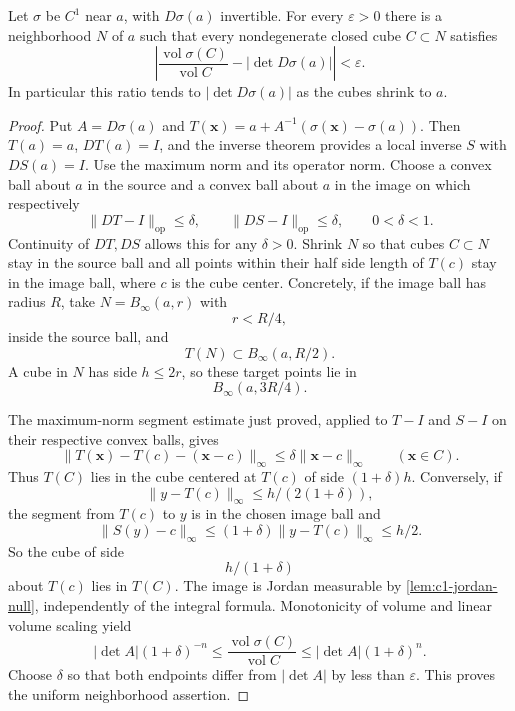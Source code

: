 \begin{proposition}\label{lem:local-volume-comparison}
Let $\sigma$ be $C^1$ near $a$, with $D\sigma(a)$ invertible. For every
$\varepsilon>0$ there is a neighborhood $N$ of $a$ such that every
nondegenerate closed cube $C\subset N$ satisfies
\[
\left|\frac{\operatorname{vol}\sigma(C)}{\operatorname{vol}C}
-|\det D\sigma(a)|\right|<\varepsilon.
\]
In particular this ratio tends to $|\det D\sigma(a)|$ as the cubes
shrink to $a$.
\end{proposition}
\begin{proof}
Put $A=D\sigma(a)$ and $T(\mathbf{x})=a+A^{-1}(\sigma(\mathbf{x})-\sigma(a))$.
Then $T(a)=a$, $DT(a)=I$, and the inverse theorem provides a local
inverse $S$ with $DS(a)=I$. Use the maximum norm and its operator norm.
Choose a convex ball about $a$ in the source and a convex ball about
$a$ in the image on which respectively
\[
\|DT-I\|_{\mathrm{op}}\leq\delta,
\qquad \|DS-I\|_{\mathrm{op}}\leq\delta,
\qquad 0<\delta<1.
\]
Continuity of $DT,DS$ allows this for any $\delta>0$.
Shrink $N$ so that cubes $C\subset N$ stay in the source ball and
all points within their half side length of $T(c)$ stay in the image
ball, where $c$ is the cube center. Concretely, if the image ball has
radius $R$, take $N=B_\infty(a,r)$ with
\[
r<R/4,
\]
 inside the source
ball, and
\[
T(N)\subset B_\infty(a,R/2).
\]
 A cube in $N$ has side
$h\leq2r$, so these target points lie in
\[
B_\infty(a,3R/4).
\]

The maximum-norm segment estimate just proved, applied to $T-I$ and
$S-I$ on their respective convex balls, gives
\[
\|T(\mathbf{x})-T(c)-(\mathbf{x}-c)\|_\infty\leq\delta\|\mathbf{x}-c\|_\infty
\qquad(\mathbf{x}\in C).
\]
Thus $T(C)$ lies in the cube centered at $T(c)$ of side $(1+\delta)h$.
Conversely, if
\[
\|y-T(c)\|_\infty\leq h/(2(1+\delta)),
\]
 the segment
from $T(c)$ to $y$ is in the chosen image ball and
\[
\|S(y)-c\|_\infty\leq(1+\delta)\|y-T(c)\|_\infty\leq h/2.
\]
So the cube of side
\[
h/(1+\delta)
\]
 about $T(c)$ lies in $T(C)$.
The image is Jordan measurable by \cref{lem:c1-jordan-null}, independently
of the integral formula. Monotonicity of volume and linear volume scaling yield
\[
|\det A|(1+\delta)^{-n}
\leq\frac{\operatorname{vol}\sigma(C)}{\operatorname{vol}C}
\leq|\det A|(1+\delta)^n.
\]
Choose $\delta$ so that both endpoints differ from $|\det A|$ by less
than $\varepsilon$. This proves the uniform neighborhood assertion.
\end{proof}

